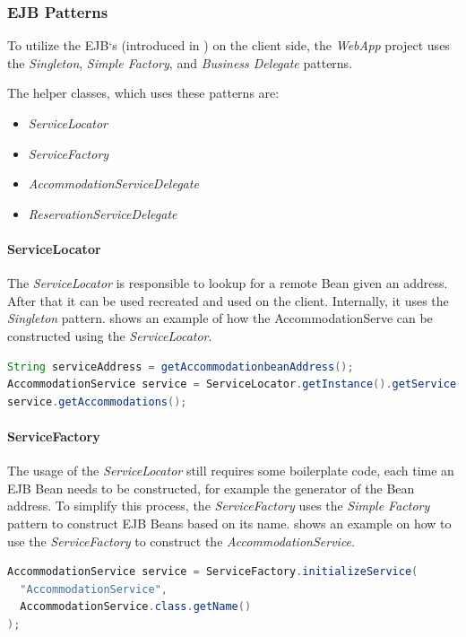 \subsubsection{EJB Patterns}\label{sec:02_design_web_patterns}
To utilize the EJB`s (introduced in ) on the client side, the \textit{WebApp} project uses the \textit{Singleton}, \textit{Simple Factory}, and \textit{Business Delegate} patterns.

The helper classes, which uses these patterns are:
\begin{itemize}
\item \textit{ServiceLocator}
\item \textit{ServiceFactory}
\item \textit{AccommodationServiceDelegate}
\item \textit{ReservationServiceDelegate}
\end{itemize}

\paragraph{ServiceLocator}
The \textit{ServiceLocator} is responsible to lookup for a remote Bean given an address. After that it can be used recreated and used on the client. Internally, it uses the \textit{Singleton} pattern.  shows an example of how the AccommodationServe can be constructed using the \textit{ServiceLocator}.
\begin{lstlisting}[label=lst:02_design_web_pattern_servicelocator, caption=Example usage of the \textit{ServiceLocator}, language=java]
String serviceAddress = getAccommodationbeanAddress();
AccommodationService service = ServiceLocator.getInstance().getService(serviceAddress);
service.getAccommodations();
\end{lstlisting}

\paragraph{ServiceFactory}
The usage of the \textit{ServiceLocator} still requires some boilerplate code, each time an EJB Bean needs to be constructed, for example the generator of the Bean address. To simplify this process, the \textit{ServiceFactory} uses the \textit{Simple Factory} pattern to construct EJB Beans based on its name.  shows an example on how to use the \textit{ServiceFactory} to construct the \textit{AccommodationService}.
\begin{lstlisting}[label=lst:02_design_web_pattern_servicefactory, caption=Example usage of the \textit{ServiceFactory}, language=java]
AccommodationService service = ServiceFactory.initializeService(
  "AccommodationService",
  AccommodationService.class.getName()
);
\end{lstlisting}

